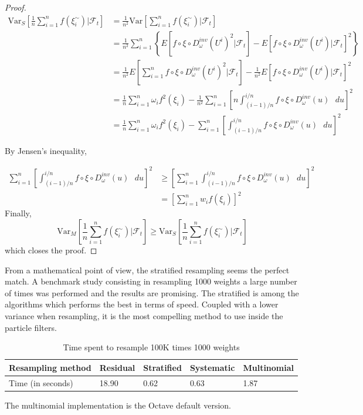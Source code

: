 \documentclass[11pt,a4,twosided,singlespacing,titlepagenumber=on]{scrreprt}
\numberwithin{equation}{chapter} %
\theoremstyle{remark}
\begin{document}
\begin{proof}
\begin{align*}
\text{Var}_S \left[ \frac{1}{n} \sum_{i=1}^n f(\xi_i^\sim) \bigg| \mathcal{F}_t \right] &= \frac{1}{n^2} \text{Var} \left[ \sum_{i=1}^n f(\xi_i^\sim) \bigg| \mathcal{F}_t \right] \\
																					  &= \frac{1}{n^2} \sum_{i=1}^n \left\{ E \left[ f \circ \xi \circ D_\omega^{inv}(U^i)^2 \bigg| \mathcal{F}_t \right] - E \left[ f \circ \xi \circ D_\omega^{inv}(U^i) \bigg| \mathcal{F}_t \right]^2 \right\}\\
																					  &= \frac{1}{n^2} E \left[ \sum_{i=1}^n f \circ \xi \circ D_\omega^{inv}(U^i)^2 \bigg| \mathcal{F}_t \right] - \frac{1}{n^2} E \left[ f \circ \xi \circ D_\omega^{inv}(U^i) \bigg| \mathcal{F}_t \right]^2 \\
																					  &= \frac{1}{n} \sum_{i=1}^n \omega_i f^2(\xi_i) - \frac{1}{n^2} \sum_{i=1}^n \left[ n \int_{(i-1)/n}^{i/n} f \circ \xi \circ D_\omega^{inv}(u)\text{ }du\right]^2 \\
																					  &= \frac{1}{n} \sum_{i=1}^n \omega_i f^2(\xi_i) - \sum_{i=1}^n \left[ \int_{(i-1)/n}^{i/n} f \circ \xi \circ D_\omega^{inv}(u)\text{ }du\right]^2
\end{align*}

By Jensen's inequality,

\begin{align*}
\sum_{i=1}^n \left[ \int_{(i-1)/n}^{i/n} f \circ \xi \circ D_\omega^{inv}(u)\text{ }du\right]^2 &\geq \left[\sum_{i=1}^n \int_{(i-1)/n}^{i/n} f \circ \xi \circ D_\omega^{inv}(u)\text{ }du\right]^2 \\
																									&= \left[ \sum_{i=1}^n w_i f(\xi_i)\right]^2
\end{align*}
Finally,
$$\text{Var}_M \left[ \frac{1}{n} \sum_{i=1}^n f(\xi_i^\sim) \bigg| \mathcal{F}_t \right] \geq \text{Var}_S \left[ \frac{1}{n} \sum_{i=1}^n f(\xi_i^\sim) \bigg| \mathcal{F}_t \right]$$
which closes the proof.
\end{proof}

\noindent
From a mathematical point of view, the stratified resampling seems the perfect match. A benchmark study consisting in resampling 1000 weights a large number of times was performed and the results are promising. The stratified is among the algorithms which performs the best in terms of speed. Coupled with a lower variance when resampling, it is the most compelling method to use inside the particle filters. 

\begin{table}[h]
\centering
\label{table1}
\begin{tabular}{|l|l|l|l|l|}
\hline
Resampling method     & Residual & Stratified & Systematic & Multinomial \\ \hline
Time (in seconds) & 18.90    & 0.62       & 0.63       & 1.87        \\ \hline
\end{tabular}
\caption{Time spent to resample 100K times 1000 weights}
\end{table}
\noindent
The multinomial implementation is the Octave default version.
\end{document}
